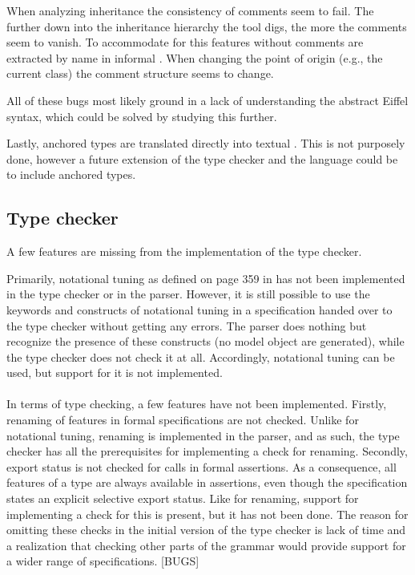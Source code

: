 When analyzing inheritance the consistency of comments seem to fail. The further down into the inheritance hierarchy the tool digs, the more the comments seem to vanish. To accommodate for this features without comments are extracted by name in informal \bon. When changing the point of origin (e.g., the current class) the comment structure seems to change.

All of these bugs most likely ground in a lack of understanding the abstract Eiffel syntax, which could be solved by studying this further.

Lastly, anchored types are translated directly into textual \bon. This is not purposely done, however a future extension of the type checker and the \bon{} language could be to include anchored types.

\subsection{Type checker}
A few features are missing from the implementation of the type checker.

Primarily, notational tuning as defined on page 359 in \cite{walden1995} has not been implemented in the type checker or in the parser. However, it is still possible to use the keywords and constructs of notational tuning in a specification handed over to the type checker without getting any errors. The parser does nothing but recognize the presence of these constructs (no model object are generated), while the type checker does not check it at all. Accordingly, notational tuning can be used, but support for it is not implemented.
\paragraph{}
In terms of type checking, a few features have not been implemented. Firstly, renaming of features in formal specifications are not checked. Unlike for notational tuning, renaming is implemented in the parser, and as such, the type checker has all the prerequisites for implementing a check for renaming. Secondly, export status is not checked for calls in formal assertions. As a consequence, all features of a type are always available in assertions, even though the specification states an explicit selective export status. Like for renaming, support for implementing a check for this is present, but it has not been done. The reason for omitting these checks in the initial version of the type checker is lack of time and a realization that checking other parts of the grammar would provide support for a wider range of specifications.
[BUGS]